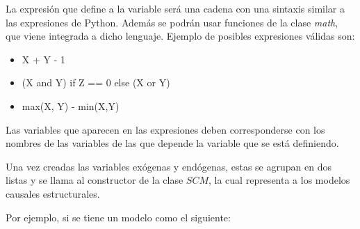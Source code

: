La expresión que define a la variable será una cadena con una sintaxis similar a las expresiones de Python. Además se podrán usar funciones de la clase \textit{math}, que viene integrada a dicho lenguaje. Ejemplo de posibles expresiones válidas son:
\begin{itemize}
	\item X + Y - 1
	\item (X and Y) if Z == 0 else (X or Y)
	\item max(X, Y) - min(X,Y)
\end{itemize}
Las variables que aparecen en las expresiones deben corresponderse con los nombres de las variables de las que depende la variable que se está definiendo.

Una vez creadas las variables exógenas y endógenas, estas se agrupan en dos listas y se llama al constructor de la clase $SCM$, la cual representa a los modelos causales estructurales.

Por ejemplo, si se tiene un modelo como el siguiente:

